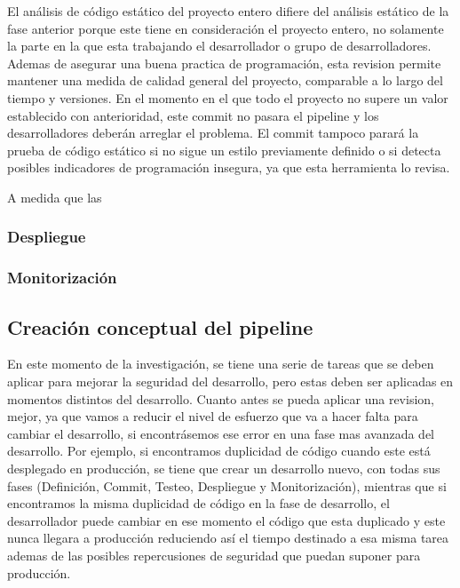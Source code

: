\documentclass[12pt]{report} %
\begin{document}
El análisis de código estático del proyecto entero difiere del análisis estático
de la fase anterior porque este tiene en consideración el proyecto entero, no
solamente la parte en la que esta trabajando el desarrollador o grupo de
desarrolladores.  Ademas de asegurar una buena practica de programación, esta
revision permite mantener una medida de calidad general del proyecto, comparable
a lo largo del tiempo y versiones.  En el momento en el que todo el proyecto no
supere un valor establecido con anterioridad, este commit no pasara el
\gls{pipeline} y los desarrolladores deberán arreglar el problema.  El commit
tampoco parará la prueba de código estático si no sigue un estilo previamente
definido o si detecta posibles indicadores de programación insegura, ya que esta
herramienta lo revisa.

A medida que las 




\subsubsection{Despliegue} \subsubsection{Monitorización}

\subsection{Creación conceptual del pipeline}

En este momento de la investigación, se tiene una serie de tareas que se deben
aplicar para mejorar la seguridad del desarrollo, pero estas deben ser aplicadas
en momentos distintos del desarrollo.  Cuanto antes se pueda aplicar una
revision, mejor, ya que vamos a reducir el nivel de esfuerzo que va a hacer
falta para cambiar el desarrollo, si encontrásemos ese error en una fase mas
avanzada del desarrollo.  Por ejemplo, si encontramos duplicidad de código
cuando este está desplegado en producción, se tiene que crear un desarrollo
nuevo, con todas sus fases (Definición, Commit, Testeo, Despliegue y
Monitorización), mientras que si encontramos la misma duplicidad de código en la
fase de desarrollo, el desarrollador puede cambiar en ese momento el código que
esta duplicado y este nunca llegara a producción reduciendo así el tiempo
destinado a esa misma tarea ademas de las posibles repercusiones de seguridad
que puedan suponer para producción. 
\end{document}
